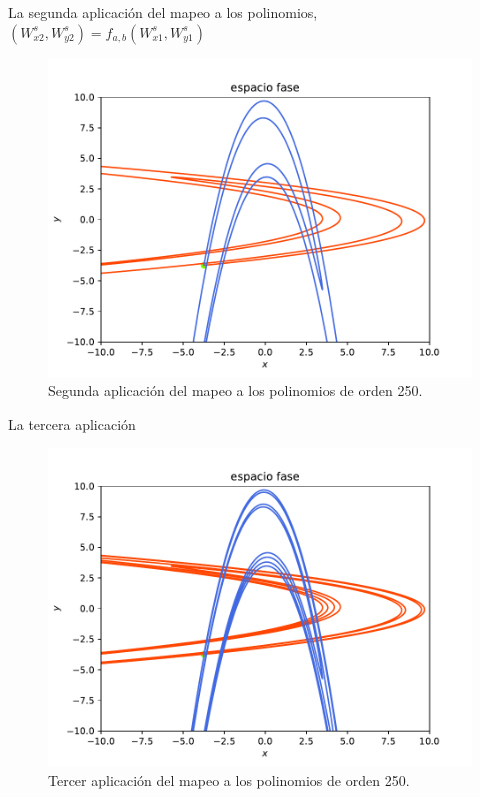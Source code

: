 \documentclass[11pt]{beamer}
\theoremstyle{definition}
\begin{document}
\begin{frame}
La segunda aplicación del mapeo a los polinomios, $(W_{x2}^{s},W_{y2}^{s})=f_{a,b}(W_{x1}^{s},W_{y1}^{s})$
\begin{figure}[h!]
\centering
\includegraphics[scale=0.6]{rectangulo2.pdf}
\caption{Segunda aplicación del mapeo a los polinomios de orden 250.}
\label{Rectangulo2}
\end{figure}

\end{frame}
\begin{frame}
La tercera aplicaci\'on
\begin{figure}[h!]
\centering
\includegraphics[scale=0.6]{rectangulo3.pdf}
\caption{Tercer aplicación del mapeo a los polinomios de orden 250.}
\label{Rectangulo3}
\end{figure}
\end{frame}
\end{document}
